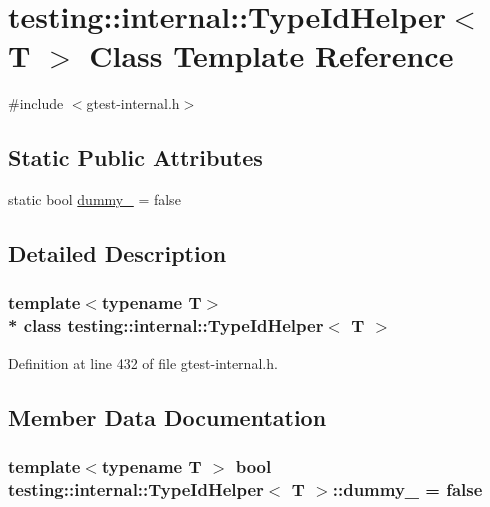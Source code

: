 \hypertarget{classtesting_1_1internal_1_1_type_id_helper}{}\section{testing\+:\+:internal\+:\+:Type\+Id\+Helper$<$ T $>$ Class Template Reference}
\label{classtesting_1_1internal_1_1_type_id_helper}


{\ttfamily \#include $<$gtest-\/internal.\+h$>$}

\subsection*{Static Public Attributes}
\begin{DoxyCompactItemize}
\item 
static bool \hyperlink{classtesting_1_1internal_1_1_type_id_helper_a372268b1520d965d0bdf01ebad3d270e}{dummy\+\_\+} = false
\end{DoxyCompactItemize}


\subsection{Detailed Description}
\subsubsection*{template$<$typename T$>$\\*
class testing\+::internal\+::\+Type\+Id\+Helper$<$ T $>$}



Definition at line 432 of file gtest-\/internal.\+h.



\subsection{Member Data Documentation}
\subsubsection[{\texorpdfstring{dummy\+\_\+}{dummy_}}]{\setlength{\rightskip}{0pt plus 5cm}template$<$typename T $>$ bool {\bf testing\+::internal\+::\+Type\+Id\+Helper}$<$ {\bf T} $>$\+::dummy\+\_\+ = false\hspace{0.3cm}{\ttfamily [static]}}\hypertarget{classtesting_1_1internal_1_1_type_id_helper_a372268b1520d965d0bdf01ebad3d270e}{}\label{classtesting_1_1internal_1_1_type_id_helper_a372268b1520d965d0bdf01ebad3d270e}


